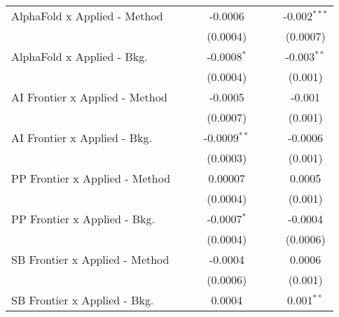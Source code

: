 \begin{tabular}{lcccccc}
   AlphaFold x Applied - Method   &                 &                & -0.0006        &                 &                & -0.002$^{***}$\\   
                                  &                 &                & (0.0004)       &                 &                & (0.0007)\\   
   AlphaFold x Applied - Bkg.     &                 &                & -0.0008$^{*}$  &                 &                & -0.003$^{**}$\\   
                                  &                 &                & (0.0004)       &                 &                & (0.001)\\   
   AI Frontier x Applied - Method &                 &                & -0.0005        &                 &                & -0.001\\   
                                  &                 &                & (0.0007)       &                 &                & (0.001)\\   
   AI Frontier x Applied - Bkg.   &                 &                & -0.0009$^{**}$ &                 &                & -0.0006\\   
                                  &                 &                & (0.0003)       &                 &                & (0.001)\\   
   PP Frontier x Applied - Method &                 &                & 0.00007        &                 &                & 0.0005\\   
                                  &                 &                & (0.0004)       &                 &                & (0.001)\\   
   PP Frontier x Applied - Bkg.   &                 &                & -0.0007$^{*}$  &                 &                & -0.0004\\   
                                  &                 &                & (0.0004)       &                 &                & (0.0006)\\   
   SB Frontier x Applied - Method &                 &                & -0.0004        &                 &                & 0.0006\\   
                                  &                 &                & (0.0006)       &                 &                & (0.001)\\   
   SB Frontier x Applied - Bkg.   &                 &                & 0.0004         &                 &                & 0.001$^{**}$\\   

\end{tabular}
